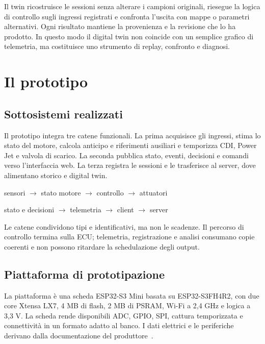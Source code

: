 \documentclass{article}
\begin{document}
Il twin ricostruisce le sessioni senza alterare i campioni originali, riesegue
la logica di controllo sugli ingressi registrati e confronta l'uscita con mappe
o parametri alternativi. Ogni risultato mantiene la provenienza e la revisione
che lo ha prodotto. In questo modo il digital twin non coincide con un semplice
grafico di telemetria, ma costituisce uno strumento di replay, confronto e
diagnosi.

\section{Il prototipo}
\label{sec:prototipo}

\subsection{Sottosistemi realizzati}

Il prototipo integra tre catene funzionali. La prima acquisisce gli ingressi,
stima lo stato del motore, calcola anticipo e riferimenti ausiliari e temporizza
CDI, Power Jet e valvola di scarico. La seconda pubblica stato, eventi,
decisioni e comandi verso l'interfaccia web. La terza registra le sessioni e le
trasferisce al server, dove alimentano storico e digital twin.

\begin{center}
sensori $\rightarrow$ stato motore $\rightarrow$ controllo $\rightarrow$
attuatori

stato e decisioni $\rightarrow$ telemetria $\rightarrow$ client
$\rightarrow$ server
\end{center}

Le catene condividono tipi e identificativi, ma non le scadenze. Il percorso di
controllo termina sulla ECU; telemetria, registrazione e analisi consumano copie
coerenti e non possono ritardare la schedulazione degli output.

\subsection{Piattaforma di prototipazione}

La piattaforma è una scheda ESP32-S3 Mini basata su ESP32-S3FH4R2, con due core
Xtensa LX7, 4 MB di flash, 2 MB di PSRAM, Wi-Fi a 2,4 GHz e logica a 3,3 V. La
scheda rende disponibili ADC, GPIO, SPI, cattura temporizzata e connettività in
un formato adatto al banco. I dati elettrici e le periferiche derivano dalla
documentazione del produttore~\cite{esp32s3_datasheet}.
\end{document}
